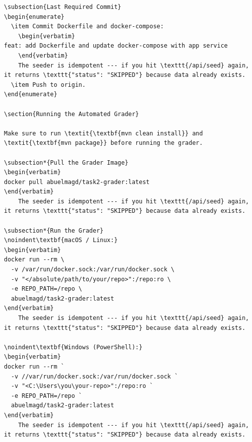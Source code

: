 \documentclass[a4paper]{article}
\begin{document}
\begin{enumerate}
\begin{lstlisting}
\subsection{Last Required Commit}
\begin{enumerate}
  \item Commit Dockerfile and docker-compose:
    \begin{verbatim}
feat: add Dockerfile and update docker-compose with app service
    \end{verbatim}
    The seeder is idempotent --- if you hit \texttt{/api/seed} again, it returns \texttt{"status": "SKIPPED"} because data already exists.
  \item Push to origin.
\end{enumerate}

\section{Running the Automated Grader}

Make sure to run \textit{\textbf{mvn clean install}} and \textit{\textbf{mvn package}} before running the grader.

\subsection*{Pull the Grader Image}
\begin{verbatim}
docker pull abuelmagd/task2-grader:latest
\end{verbatim}
    The seeder is idempotent --- if you hit \texttt{/api/seed} again, it returns \texttt{"status": "SKIPPED"} because data already exists.

\subsection*{Run the Grader}
\noindent\textbf{macOS / Linux:}
\begin{verbatim}
docker run --rm \
  -v /var/run/docker.sock:/var/run/docker.sock \
  -v "</absolute/path/to/your/repo>":/repo:ro \
  -e REPO_PATH=/repo \
  abuelmagd/task2-grader:latest
\end{verbatim}
    The seeder is idempotent --- if you hit \texttt{/api/seed} again, it returns \texttt{"status": "SKIPPED"} because data already exists.

\noindent\textbf{Windows (PowerShell):}
\begin{verbatim}
docker run --rm `
  -v //var/run/docker.sock:/var/run/docker.sock `
  -v "<C:\Users\you\your-repo>":/repo:ro `
  -e REPO_PATH=/repo `
  abuelmagd/task2-grader:latest
\end{verbatim}
    The seeder is idempotent --- if you hit \texttt{/api/seed} again, it returns \texttt{"status": "SKIPPED"} because data already exists.


\end{lstlisting}
\end{enumerate}
\end{document}
